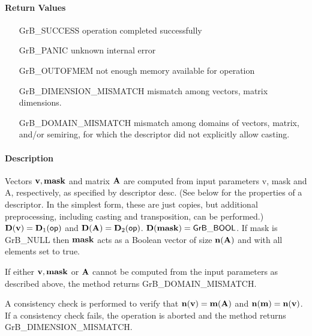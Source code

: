\paragraph{Return Values}


\begin{itemize}[leftmargin=2.1in]
\item[{\sf GrB\_SUCCESS}]             operation completed successfully
\item[{\sf GrB\_PANIC}]               unknown internal error
\item[{\sf GrB\_OUTOFMEM}]            not enough memory available for operation
\item[{\sf GrB\_DIMENSION\_MISMATCH}] mismatch among vectors, matrix dimensions.
\item[{\sf GrB\_DOMAIN\_MISMATCH}]    mismatch among domains of vectors, matrix, and/or semiring, for which the descriptor did not explicitly allow casting.
\end{itemize}

\paragraph{Description}

Vectors ${\bf v}, {\bf mask}$ and matrix ${\bf A}$ are computed from
input parameters {\sf v}, {\sf mask} and {\sf A}, respectively, as specified
by descriptor {\sf desc}. (See below for the properties of a descriptor. In
the simplest form, these are just copies, but additional preprocessing,
including casting and transposition, can be performed.)  $\bold{D}({\bf v}) =
\bold{D}_1({\sf op})$ and $\bold{D}({\bf A}) = \bold{D}_2({\sf op})$.
$\bold{D}({\bf mask}) = {\sf GrB\_BOOL}$.  If {\sf mask} is {\sf GrB\_NULL}
then ${\bf mask}$ acts as a Boolean vector of size $\bold{n}({\bf A})$
and with all elements set to {\sf true}.

If either ${\bf v}, {\bf mask}$ or ${\bf A}$ cannot be computed
from the input parameters as described above, the method returns {\sf
GrB\_DOMAIN\_MISMATCH}.

A consistency check is performed to verify that $\bold{n}({\bf v})
= \bold{m}({\bf A})$ and $\bold{n}({\bf m}) =
\bold{n}({\bf v})$. If a consistency check fails, the operation is
aborted and the method returns {\sf GrB\_DIMENSION\_MISMATCH}.

